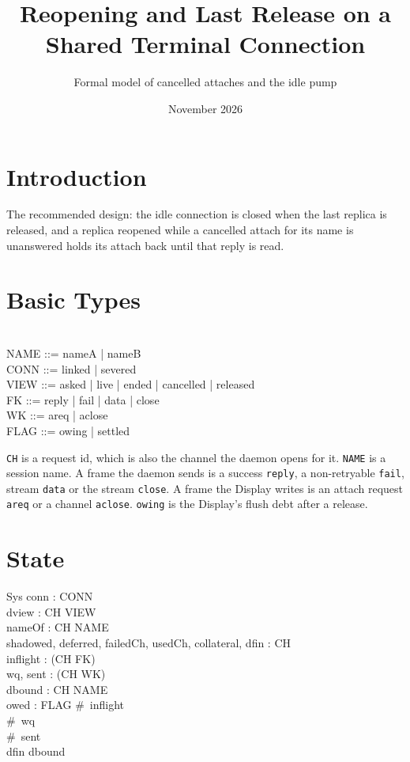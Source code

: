 \documentclass[a4paper,10pt,fleqn]{article}
\begin{document}
\title{Reopening and Last Release on a Shared Terminal Connection}
\author{Formal model of cancelled attaches and the idle pump}
\date{November 2026}
\maketitle

\section{Introduction}

The recommended design: the idle connection is closed when the last replica is released, and a replica reopened while a cancelled attach for its name is unanswered holds its attach back until that reply is read.

\section{Basic Types}

\begin{zed}
  [CH] \\
  NAME ::= nameA | nameB \\
  CONN ::= linked | severed \\
  VIEW ::= asked | live | ended | cancelled | released \\
  FK ::= reply | fail | data | close \\
  WK ::= areq | aclose \\
  FLAG ::= owing | settled
\end{zed}

\texttt{CH} is a request id, which is also the channel the daemon opens for
it.  \texttt{NAME} is a session name.  A frame the daemon sends is a
success \texttt{reply}, a non-retryable \texttt{fail}, stream \texttt{data}
or the stream \texttt{close}.  A frame the Display writes is an attach
request \texttt{areq} or a channel \texttt{aclose}.  \texttt{owing} is the
Display's flush debt after a release.

\section{State}

\begin{schema}{Sys}
  conn : CONN \\
  dview : CH \pfun VIEW \\
  nameOf : CH \pfun NAME \\
  shadowed, deferred, failedCh, usedCh, collateral, dfin : \power CH \\
  inflight : \seq (CH \cross FK) \\
  wq, sent : \seq (CH \cross WK) \\
  dbound : CH \pfun NAME \\
  owed : FLAG
\where
  \#~inflight  \\
  \#~wq  \\
  \#~sent  \\
  dfin \subseteq \dom dbound
\end{schema}
\end{document}
